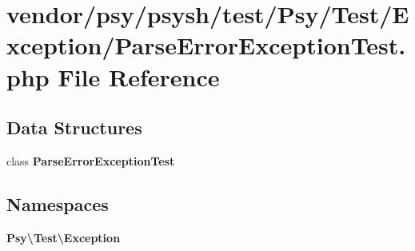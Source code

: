 \section{vendor/psy/psysh/test/\+Psy/\+Test/\+Exception/\+Parse\+Error\+Exception\+Test.php File Reference}
\label{_parse_error_exception_test_8php}
\subsection*{Data Structures}
\begin{DoxyCompactItemize}
\item 
class {\bf Parse\+Error\+Exception\+Test}
\end{DoxyCompactItemize}
\subsection*{Namespaces}
\begin{DoxyCompactItemize}
\item 
 {\bf Psy\textbackslash{}\+Test\textbackslash{}\+Exception}
\end{DoxyCompactItemize}
